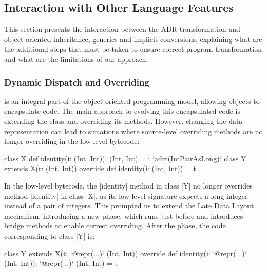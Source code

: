 \subsection{Interaction with Other Language Features}
\label{sec:ildl:language-features}

This section presents the interaction between the ADR transformation and object-oriented inheritance, generics and implicit conversions, explaining what are the additional steps that must be taken to ensure correct program transformation and what are the limitations of our approach.

\subsubsection{Dynamic Dispatch and Overriding}
\label{sec:ildl:language-overriding}
is an integral part of the object-oriented programming model, allowing objects to encapsulate code. The main approach to evolving this encapsulated code is extending the class and overriding its methods. However, changing the data representation can lead to situations where source-level overriding methods are no longer overriding in the low-level bytecode:

\begin{lstlisting-nobreak}
class X {
  def identity(i: (Int, Int)): (Int, Int) = i
}
`adrt(IntPairAsLong)` {
  class Y extends X(t: (Int, Int)) {
    override def identity(i: (Int, Int)) = t
  }
}
\end{lstlisting-nobreak}

In the low-level bytecode, the |identity| method in class |Y| no longer overrides method |identity| in class |X|, as its low-level signature expects a long integer instead of a pair of integers. This prompted us to extend the Late Data Layout mechanism, introducing a new \bridge{} phase, which runs just before \coerce{} and introduces bridge methods to enable correct overriding. After the \inject{} phase, the code corresponding to class |Y| is:

\begin{lstlisting-nobreak}
class Y extends X(t: `@repr(...)` (Int, Int)) {
  override def identity(i: `@repr(...)` (Int, Int)): `@repr(...)` (Int, Int) = t
}
\end{lstlisting-nobreak}

